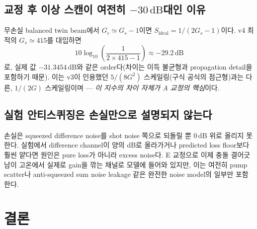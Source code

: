 \documentclass[11pt,a4paper]{article}
\newcommand{\dB}{\,\mathrm{dB}}
\begin{document}
\subsection{교정 후 이상 스캔이 여전히 $-30\dB$대인 이유}
무손실 balanced twin beam에서 $G_c\simeq G_s-1$이면
$S_{\mathrm{ideal}}=1/(2G_s-1)$이다. v4 최적의 $G_s\simeq415$를 대입하면
\begin{equation}
10\log_{10}\!\left(\frac{1}{2\times415-1}\right)\approx-29.2\dB
\end{equation}
로, 실제 값 $-31.3454\dB$와 같은 order다(차이는 이득 불균형과 propagation
detail을 포함하기 때문). 이는 v3이 인용했던 $5/(8G^2)$ 스케일링(구식 공식의
점근형)과는 다른, $1/(2G)$ 스케일링이며 — \emph{이 지수의 차이 자체가 A
교정의 핵심}이다.

\subsection{실험 안티스퀴징은 손실만으로 설명되지 않는다}
손실은 squeezed difference noise를 shot noise 쪽으로 되돌릴 뿐 $0\dB$ 위로
올리지 못한다. 실험에서 difference channel이 양의 dB로 올라가거나 predicted
loss floor보다 훨씬 얕다면 원인은 pure loss가 아니라 excess noise다. E
교정으로 이제 충돌 결어긋남이 고온에서 실제로 gain을 깎는 채널로 모델에
들어와 있지만, 이는 여전히 pump scatter나 anti-squeezed sum noise leakage
같은 완전한 noise model의 일부만 포함한다.

\section{결론}
\end{document}
